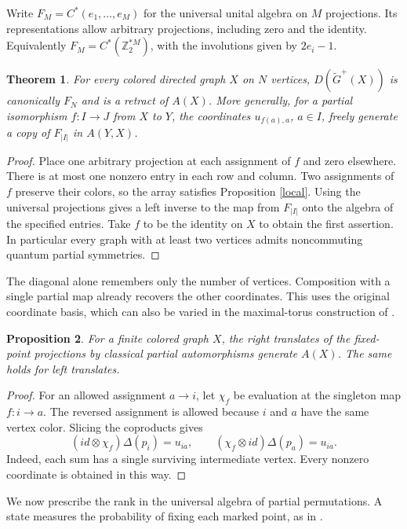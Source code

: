 \documentclass[11pt,a4paper]{article}
\newtheorem{thm}{Theorem}[section]
\newtheorem{prop}[thm]{Proposition}
\begin{document}
Write $F_M=C^*(e_1,\ldots,e_M)$ for the universal unital algebra on $M$ projections. Its representations allow arbitrary projections, including zero and the identity. Equivalently $F_M=C^*(\mathbb Z_2^{*M})$, with the involutions given by $2e_i-1$.

\begin{thm}\label{partialdiag}
For every colored directed graph $X$ on $N$ vertices, $D(\widetilde G^+(X))$ is canonically $F_N$ and is a retract of $A(X)$. More generally, for a partial isomorphism $f:I\to J$ from $X$ to $Y$, the coordinates $u_{f(a),a}$, $a\in I$, freely generate a copy of $F_{|I|}$ in $A(Y,X)$.
\end{thm}
\begin{proof}
Place one arbitrary projection at each assignment of $f$ and zero elsewhere. There is at most one nonzero entry in each row and column. Two assignments of $f$ preserve their colors, so the array satisfies Proposition \ref{local}. Using the universal projections gives a left inverse to the map from $F_{|I|}$ onto the algebra of the specified entries. Take $f$ to be the identity on $X$ to obtain the first assertion. In particular every graph with at least two vertices admits noncommuting quantum partial symmetries.
\end{proof}

The diagonal alone remembers only the number of vertices. Composition with a single partial map already recovers the other coordinates. This uses the original coordinate basis, which can also be varied in the maximal-torus construction of \cite{tori}.

\begin{prop}
For a finite colored graph $X$, the right translates of the fixed-point projections by classical partial automorphisms generate $A(X)$. The same holds for left translates.
\end{prop}
\begin{proof}
For an allowed assignment $a\to i$, let $\chi_f$ be evaluation at the singleton map $f:i\to a$. The reversed assignment is allowed because $i$ and $a$ have the same vertex color. Slicing the coproducts gives
\[
 (id\otimes\chi_f)\Delta(p_i)=u_{ia},
 \qquad
 (\chi_f\otimes id)\Delta(p_a)=u_{ia}.
\]
Indeed, each sum has a single surviving intermediate vertex. Every nonzero coordinate is obtained in this way.
\end{proof}

We now prescribe the rank in the universal algebra of partial permutations. A state measures the probability of fixing each marked point, as in \cite{mcstate}.
\end{document}
